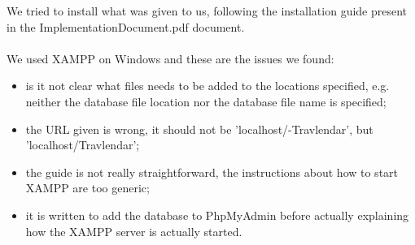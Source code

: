 We tried to install what was given to us, following the installation guide present in the ImplementationDocument.pdf document. \\ \\
We used XAMPP on Windows and these are the issues we found:
\begin{itemize}
	\item is it not clear what files needs to be added to the locations specified, e.g. neither the database file location nor the database file name is specified;
	\item the URL given is wrong, it should not be 'localhost/-Travlendar', but 'localhost/Travlendar';
	\item the guide is not really straightforward, the instructions about how to start XAMPP are too generic;
	\item it is written to add the database to PhpMyAdmin before actually explaining how the XAMPP server is actually started.
\end{itemize}